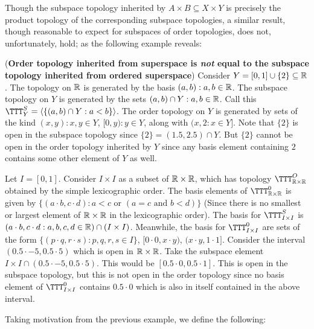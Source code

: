 \documentclass[main.tex]{subfiles}
\begin{document}
Though the subspace topology inherited by $A \times B \subseteq X \times Y$ is precisely the product topology of the corresponding subspace topologies, a similar result, though reasonable to expect for subspaces of order topologies, does not, unfortunately, hold; as the following example reveals:
\begin{example} (\textbf{Order topology inherited from superspace is \emph{not} equal to the subspace topology inherited from ordered superspace})
    Consider $Y=[0,1] \cup \{2\} \subseteq \mathbb R$. The topology on $\mathbb R$ is generated by the basis $(a,b):a,b \in \mathbb R$. The subspace topology on $Y$ is generated by the sets $(a,b) \cap Y: a,b \in \mathbb R$. Call this $\TTT^S_Y=\langle \{(a,b)\cap Y: a<b\}\rangle$.  The order topology on $Y$ is generated by sets of the kind $(x,y): x,y \in Y$, $[0,y): y \in Y$, along with $(x,2: x \in Y]$. Note that $\{2\}$ is open in the subspace topology since $\{2\}=(1.5,2.5) \cap Y$. But $\{2\}$ cannot be open in the order topology inherited by $Y$ since any basis element containing $2$ contains some other element of $Y$ as well. \end{example}

    \begin{example}
        Let $I=[0,1]$. Consider $I \times I$ as a subset of $\mathbb R\times \mathbb R$, which has topology $\TTT^O_{\RR \times \RR}$ obtained by the simple lexicographic order. The basis elements of $\TTT^0_{\RR \times \RR}$ is given by $\{(a\cdot b, c \cdot d): a<c \text{ or } (a=c \text{ and }b<d )\}$ (Since there is no smallest or largest element of $\mathbb R \times \mathbb R$ in the lexicographic order). The basis for $\TTT^S_{I \times I}$ is $(a\cdot b, c\cdot d: a,b,c,d \in \mathbb R ) \cap (I \times I)$. Meanwhile, the basis for $\TTT^0_{I \times I}$ are sets of the form $\{(p\cdot q, r\cdot s):p,q,r,s \in I\}$, $[0\cdot 0, x \cdot y)$, $(x\cdot y, 1\cdot 1]$. Consider the interval $(0.5\cdot-5,0.5\cdot5)$ which is open in $\mathbb R \times \mathbb R$. Take the subspace element $I \times I \cap (0.5 \cdot -5, 0.5\cdot 5)$. This would be $[0.5 \cdot 0, 0.5 \cdot 1]$. This is open in the subspace topology, but this is not open in the order topology since no basis element of $\TTT^0_{I \times I}$ contains $0.5 \cdot 0$ which is also in itself contained in the above interval.
\end{example}
Taking motivation from the previous example, we define the following:
\end{document}

